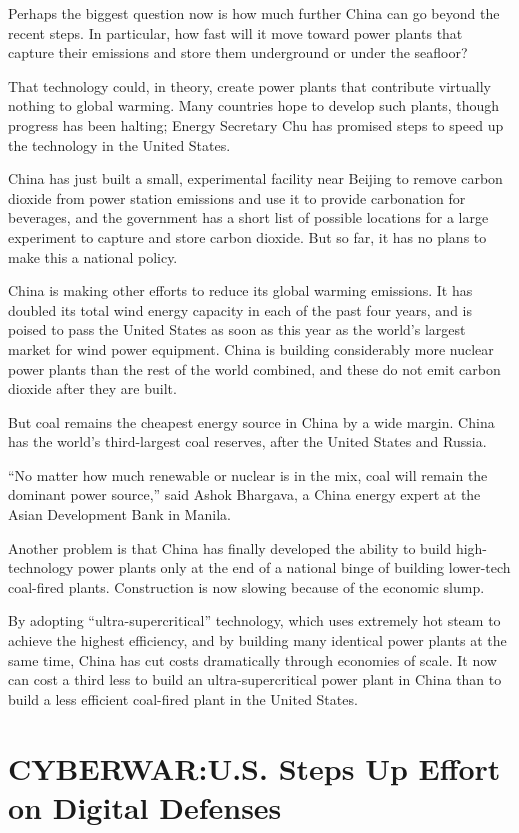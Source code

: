 \documentclass[12pt,a4paper,onecolumn]{article}
\begin{document}
Perhaps the biggest question now is how much further China can go beyond the recent steps. In
particular, how fast will it move toward power plants that capture their emissions and store them
underground or under the seafloor?

That technology could, in theory, create power plants that contribute virtually nothing to global
warming. Many countries hope to develop such plants, though progress has been halting; Energy
Secretary Chu has promised steps to speed up the technology in the United States.

China has just built a small, experimental facility near Beijing to remove carbon dioxide from power
station emissions and use it to provide carbonation for beverages, and the government has a short
list of possible locations for a large experiment to capture and store carbon dioxide. But so far,
it has no plans to make this a national policy.

China is making other efforts to reduce its global warming emissions. It has doubled its total wind
energy capacity in each of the past four years, and is poised to pass the United States as soon as
this year as the world's largest market for wind power equipment. China is building considerably
more nuclear power plants than the rest of the world combined, and these do not emit carbon dioxide
after they are built.

But coal remains the cheapest energy source in China by a wide margin. China has the world's
third-largest coal reserves, after the United States and Russia.

``No matter how much renewable or nuclear is in the mix, coal will remain the dominant power
source,'' said Ashok Bhargava, a China energy expert at the Asian Development Bank in Manila.

Another problem is that China has finally developed the ability to build high-technology power
plants only at the end of a national binge of building lower-tech coal-fired plants. Construction is
now slowing because of the economic slump.

By adopting ``ultra-supercritical'' technology, which uses extremely hot steam to achieve the highest
efficiency, and by building many identical power plants at the same time, China has cut costs
dramatically through economies of scale. It now can cost a third less to build an
ultra-supercritical power plant in China than to build a less efficient coal-fired plant in the
United States.


\section{CYBERWAR:U.S. Steps Up Effort on Digital Defenses}
\end{document}
